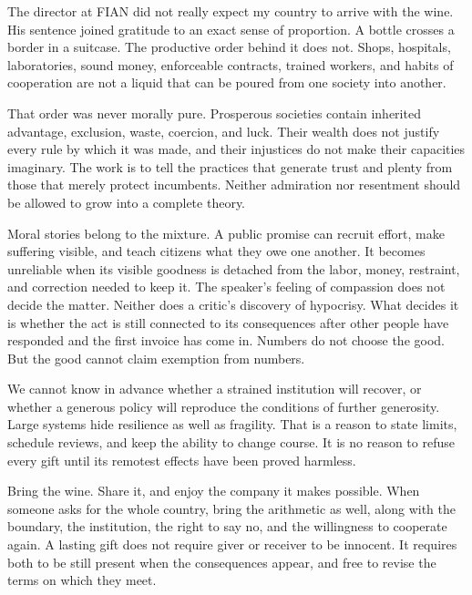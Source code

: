 \documentclass[12pt,a4paper]{book}
\begin{document}
The director at FIAN did not really expect my country to arrive with the wine. His sentence joined gratitude to an exact sense of proportion. A bottle crosses a border in a suitcase. The productive order behind it does not. Shops, hospitals, laboratories, sound money, enforceable contracts, trained workers, and habits of cooperation are not a liquid that can be poured from one society into another.

That order was never morally pure. Prosperous societies contain inherited advantage, exclusion, waste, coercion, and luck. Their wealth does not justify every rule by which it was made, and their injustices do not make their capacities imaginary. The work is to tell the practices that generate trust and plenty from those that merely protect incumbents. Neither admiration nor resentment should be allowed to grow into a complete theory.

Moral stories belong to the mixture. A public promise can recruit effort, make suffering visible, and teach citizens what they owe one another. It becomes unreliable when its visible goodness is detached from the labor, money, restraint, and correction needed to keep it. The speaker's feeling of compassion does not decide the matter. Neither does a critic's discovery of hypocrisy. What decides it is whether the act is still connected to its consequences after other people have responded and the first invoice has come in. Numbers do not choose the good. But the good cannot claim exemption from numbers.

We cannot know in advance whether a strained institution will recover, or whether a generous policy will reproduce the conditions of further generosity. Large systems hide resilience as well as fragility. That is a reason to state limits, schedule reviews, and keep the ability to change course. It is no reason to refuse every gift until its remotest effects have been proved harmless.

Bring the wine. Share it, and enjoy the company it makes possible. When someone asks for the whole country, bring the arithmetic as well, along with the boundary, the institution, the right to say no, and the willingness to cooperate again. A lasting gift does not require giver or receiver to be innocent. It requires both to be still present when the consequences appear, and free to revise the terms on which they meet.




\end{document}
